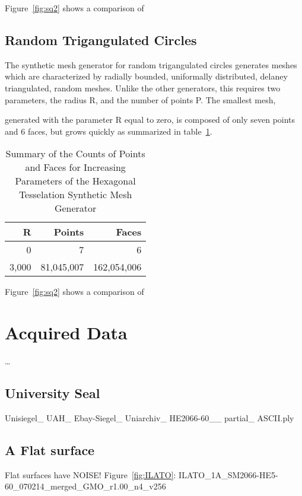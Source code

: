 Figure~\ref{fig:sq2} shows a comparison of


%
%
%
%
\subsection{Random Trigangulated Circles}
The synthetic mesh generator for random trigangulated circles generates meshes which are characterized by radially bounded, uniformally distributed, delaney triangulated, random meshes. Unlike the other generators, this requires two parameters, the radius R, and the number of points P. The smallest mesh,



generated with the parameter R equal to zero, is composed of only seven points and 6 faces, but grows quickly as summarized in table~\ref{tbl:hex}.

\begin{table}[ht]
\begin{tabular}{rrr}
\textbf{R} & \textbf{Points} & \textbf{Faces} \\
\hline
    0 &          7 &           6\\
3,000 & 81,045,007 & 162,054,006%
\caption{Summary of the Counts of Points and Faces for Increasing Parameters of the Hexagonal Tesselation Synthetic Mesh Generator\label{tbl:hex}}
\end{tabular}
\end{table}

Figure~\ref{fig:sq2} shows a comparison of
%

%
%
%
%
%
%
\section{Acquired Data}
\dots

%
%
%
%
\subsection{University Seal}
Unisiegel\_\- UAH\_\- Ebay-Siegel\_\- Uniarchiv\_\- HE2066-60\_\_\- partial\_\- ASCII.ply
%

%
%
%
%
\subsection{A Flat surface}
Flat surfaces have NOISE!
Figure~\ref{fig:ILATO}: ILATO\_1A\_SM2066-HE5-60\_070214\_merged\_GMO\_r1.00\_n4\_v256
%

